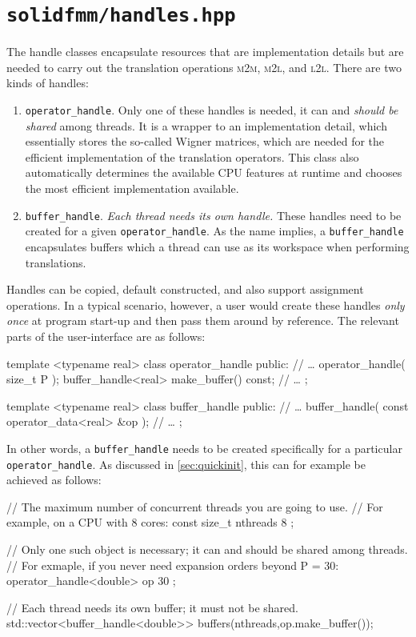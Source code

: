 \documentclass{scrbook}
\newcommand{\MtoM}{\textsc{m2m}}
\newcommand{\MtoL}{\textsc{m2l}}
\newcommand{\LtoL}{\textsc{l2l}}
\begin{document}
\section{\texttt{solidfmm/handles.hpp}}\label{sec:handles}
The handle classes encapsulate resources that are implementation details but
are needed to carry out the translation operations \MtoM, \MtoL, and \LtoL.
There are two kinds of handles:
\begin{enumerate}
\item \lstinline|operator_handle|. Only one of these handles is needed, it
can and \emph{should be shared} among threads. It is a wrapper to an
implementation detail, which essentially stores the so-called Wigner matrices,
which are needed for the efficient implementation of the translation operators.
This class also automatically determines the available CPU features at runtime
and chooses the most efficient implementation available.
\item \lstinline|buffer_handle|. \emph{Each thread needs its own handle.} These
handles need to be created for a given \lstinline|operator_handle|. As the
name implies, a \lstinline|buffer_handle| encapsulates buffers which a thread
can use as its workspace when performing translations.
\end{enumerate}

Handles can be copied, default constructed, and also support assignment
operations. In a typical scenario, however, a user would create these handles
\emph{only once} at program start-up and then pass them around by reference.
The relevant parts of the user-interface are as follows:
\begin{cppcode*}
template <typename real>
class operator_handle
{
public:
	// …
    operator_handle( size_t P );
    buffer_handle<real> make_buffer() const;    
	// …
};

template <typename real>
class buffer_handle
{
public:
	// …
    buffer_handle( const operator_data<real> &op );
	// …
};
\end{cppcode*}

In other words, a \lstinline|buffer_handle| needs to be created specifically
for a particular \lstinline|operator_handle|. As discussed in
\cref{sec:quickinit}, this can for example be achieved as follows:
\begin{cppcode*}
// The maximum number of concurrent threads you are going to use.
// For example, on a CPU with 8 cores:
const size_t nthreads { 8 };

// Only one such object is necessary; it can and should be shared among threads.
// For exmaple, if you never need expansion orders beyond P = 30:
operator_handle<double> op  { 30 }; 
                                     
// Each thread needs its own buffer; it must not be shared.
std::vector<buffer_handle<double>> buffers(nthreads,op.make_buffer());
\end{cppcode*}
\end{document}
